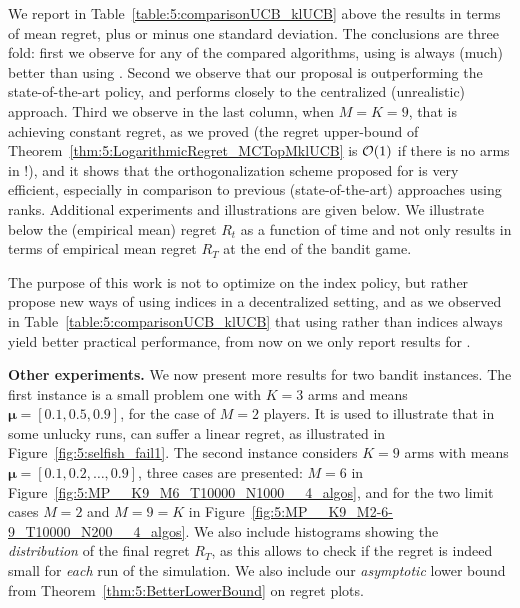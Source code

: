 We report in Table~\ref{table:5:comparisonUCB_klUCB} above the results in terms of mean regret, plus or minus one standard deviation.
The conclusions are three fold: first we observe for any of the compared algorithms, using \klUCB{} is always (much) better than using \UCB.
Second we observe that our proposal \MCTopM{} is outperforming the state-of-the-art \RhoRand{} policy, and performs closely to the centralized (unrealistic) approach.
Third we observe in the last column, when $M=K=9$, that \MCTopM{} is achieving constant regret, as we proved (the regret upper-bound of Theorem~\ref{thm:5:LogarithmicRegret_MCTopMklUCB} is $\mathcal{O}(1)$ if there is no arms in \Mworst{} !), and it shows that the orthogonalization scheme proposed for \MCTopM{} is very efficient, especially in comparison to previous (state-of-the-art) approaches using ranks.
%
Additional experiments and illustrations are given below.
We illustrate below the (empirical mean) regret $R_t$ as a function of time and not only results in terms of empirical mean regret $R_T$ at the end of the bandit game.


The purpose of this work is not to optimize on the index policy, but rather propose new ways of using indices in a decentralized setting,
and as we observed in Table~\ref{table:5:comparisonUCB_klUCB} that using \klUCB{} rather than \UCB{} indices always yield better practical performance,
from now on we only report results for \klUCB.


\textbf{Other experiments.}
%
We now present more results for two bandit instances.
  The first instance is a small problem one with $K=3$ arms and means
  $\boldsymbol{\mu} = [0.1, 0.5, 0.9]$, for the case of $M=2$ players.
  It is used to illustrate that in some unlucky runs, \Selfish{} can suffer a linear regret, as illustrated in Figure~\ref{fig:5:selfish_fail1}.
  The second instance considers $K=9$ arms with means $\boldsymbol{\mu} = [0.1, 0.2, \dots, 0.9]$,
  three cases are presented: $M=6$ in Figure~\ref{fig:5:MP__K9_M6_T10000_N1000__4_algos},
  and for the two limit cases $M=2$ and $M=9=K$ in Figure~\ref{fig:5:MP__K9_M2-6-9_T10000_N200__4_algos}.
%
We also include histograms showing the \emph{distribution} of the final regret $R_T$,
as this allows to check if the regret is indeed small for \emph{each} run of the simulation.
%
We also include our \emph{asymptotic} lower bound from Theorem~\ref{thm:5:BetterLowerBound} on regret plots.



